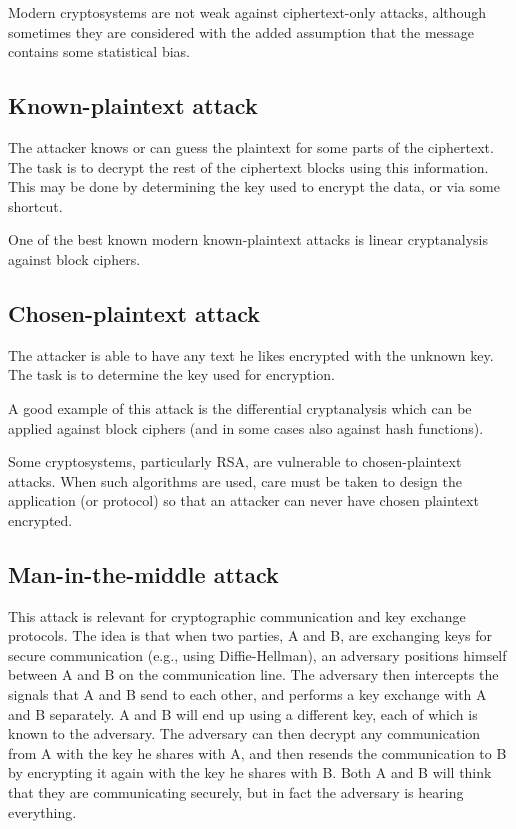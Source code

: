 \documentclass[12pt]{article}
\begin{document}
Modern cryptosystems are not weak against ciphertext-only attacks, although sometimes they are considered with the added assumption that the message contains some statistical bias.

\subsection{Known-plaintext attack}
The attacker knows or can guess the plaintext for some parts of the ciphertext. The task is to decrypt the rest of the ciphertext blocks using this information. This may be done by determining the key used to encrypt the data, or via some shortcut.

One of the best known modern known-plaintext attacks is linear cryptanalysis against block ciphers.

\subsection{Chosen-plaintext attack}
The attacker is able to have any text he likes encrypted with the unknown key. The task is to determine the key used for encryption.

A good example of this attack is the differential cryptanalysis which can be applied against block ciphers (and in some cases also against hash functions).

Some cryptosystems, particularly RSA, are vulnerable to chosen-plaintext attacks. When such algorithms are used, care must be taken to design the application (or protocol) so that an attacker can never have
chosen plaintext encrypted.

\subsection{Man-in-the-middle attack}
This attack is relevant for cryptographic communication and key exchange
protocols. The idea is that when two parties, A and B, are exchanging keys for secure communication (e.g., using Diffie-Hellman), an adversary positions himself between A and B on the communication line. The adversary then intercepts the signals that A and B send to each other, and performs a key exchange with A and B separately. A and B will end up using a different key, each of which is known to the adversary. The adversary can then decrypt any communication from A with the key he shares with A, and then resends the communication to B by encrypting it again with the key he shares with B. Both A and B will think that they are communicating securely, but in fact the adversary is hearing everything.
\end{document}
